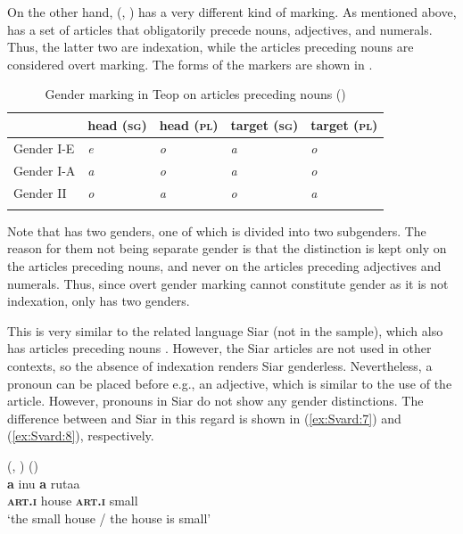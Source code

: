 \documentclass[output=collectionpaper]{langsci/langscibook}
\begin{document}
On the other hand,  (, ) has a very different kind of marking. As mentioned above,  has a set of articles that obligatorily precede nouns, adjectives, and numerals. Thus, the latter two are indexation, while the articles preceding nouns are considered overt marking. The forms of the markers are shown in .


\begin{table}
\begin{tabular}{lllll}
\lsptoprule
& head (\textsc{sg}) & head \textsc{(pl)} & target \textsc{(sg)} & target \textsc{(pl)}\\
\midrule
Gender I-E & \itshape e & \itshape o & \itshape a & \itshape o\\
Gender I-A & \itshape a & \itshape o & \itshape a & \itshape o\\
Gender II & \itshape o & \itshape a & \itshape o & \itshape a\\
\lspbottomrule
\end{tabular}
\caption{Gender marking in Teop on articles preceding nouns (\citealt[322]{Mosel2000})}
\label{tab:Svard:12}
\end{table}


Note that  has two genders, one of which is divided into two subgenders. The reason for them not being separate gender is that the distinction is kept only on the articles preceding nouns, and never on the articles preceding adjectives and numerals. Thus, since overt gender marking cannot constitute gender as it is not indexation,  only has two genders.


This is very similar to the related  language Siar (not in the sample), which also has articles preceding nouns \citep{Frowein2011}. However, the Siar articles are not used in other contexts, so the absence of indexation renders Siar genderless. Nevertheless, a pronoun can be placed before e.g., an adjective, which is similar to the use of the  article. However, pronouns in Siar do not show any gender distinctions. The difference between  and Siar in this regard is shown in (\ref{ex:Svard:7}) and (\ref{ex:Svard:8}), respectively.


\ea
\label{ex:Svard:7}
 (, ) (\citealt[326]{Mosel2000})\\
\gll \textbf{a} inu \textbf{a} rutaa\\
     \textsc{\textbf{art.i}} house \textsc{\textbf{art.i}} small\\
\glt `the small house / the house is small'
\z
\end{document}
